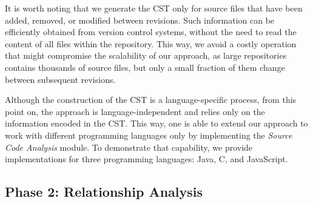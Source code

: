 It is worth noting that we generate the CST only for source files that have been added, removed, or modified between revisions. 
Such information can be efficiently obtained from version control systems, without the need to read the content of all files within the repository.
This way, we avoid a costly operation that might compromise the scalability of our approach, as large repositories contains thousands of source files, but only a small fraction of them change between subsequent revisions.

Although the construction of the CST is a language-specific process, from this point on, the approach is language-independent and relies only on the information encoded in the CST.
This way, one is able to extend our approach to work with different programming languages only by implementing the \emph{Source Code Analysis} module.
To demonstrate that capability, we provide implementations for three programming languages: Java, C, and JavaScript.


\subsection{Phase 2: Relationship Analysis}


